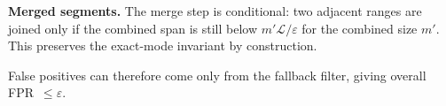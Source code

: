 \textbf{Merged segments.} The merge step is conditional: two adjacent ranges are
joined only if the combined span is still below $m'\mathcal{L}/\varepsilon$ for the
combined size $m'$. This preserves the exact-mode invariant by construction.

False positives can therefore come only from the fallback filter, giving overall
FPR~$\leq \varepsilon$.
